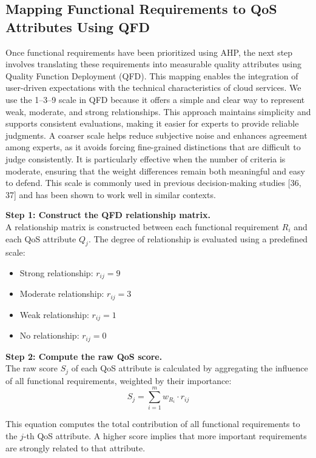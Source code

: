 \documentclass[twocolumn]{svjour3}
\begin{document}
\subsection{Mapping Functional Requirements to QoS Attributes Using QFD}

Once functional requirements have been prioritized using AHP, the next step involves translating these requirements into measurable quality attributes using Quality Function Deployment (QFD). This mapping enables the integration of user-driven expectations with the technical characteristics of cloud services. We use the 1–3–9 scale in QFD because it offers a simple and clear way to represent weak, moderate, and strong relationships. This approach maintains simplicity and supports consistent evaluations, making it easier for experts to provide reliable judgments. A coarser scale helps reduce subjective noise and enhances agreement among experts, as it avoids forcing fine-grained distinctions that are difficult to judge consistently. It is particularly effective when the number of criteria is moderate, ensuring that the weight differences remain both meaningful and easy to defend. This scale is commonly used in previous decision-making studies [36, 37] and has been shown to work well in similar contexts. 


\textbf{Step 1: Construct the QFD relationship matrix.} \\
A relationship matrix is constructed between each functional requirement $R_i$ and each QoS attribute $Q_j$. The degree of relationship is evaluated using a predefined scale:
\begin{itemize}
  \item Strong relationship: $r_{ij} = 9$
  \item Moderate relationship: $r_{ij} = 3$
  \item Weak relationship: $r_{ij} = 1$
  \item No relationship: $r_{ij} = 0$
\end{itemize}

\textbf{Step 2: Compute the raw QoS score.} \\
The raw score $S_j$ of each QoS attribute is calculated by aggregating the influence of all functional requirements, weighted by their importance:
\begin{equation}
S_j = \sum_{i=1}^{m} w_{R_i} \cdot r_{ij}
\label{eq:raw_qos_score}
\end{equation}

This equation computes the total contribution of all functional requirements to the $j$-th QoS attribute. A higher score implies that more important requirements are strongly related to that attribute.
\end{document}

